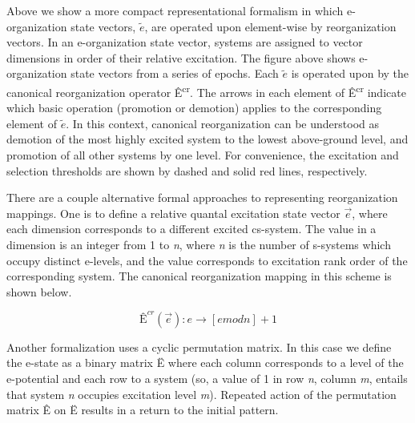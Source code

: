   Above we show a more compact representational formalism in which e-organization state vectors,  $\widetilde{{e}}$, are operated upon element-wise by reorganization vectors. In an e-organization state vector, systems are assigned to vector dimensions in order of their relative excitation. The figure above shows e-organization state vectors from a series of epochs. Each  $\widetilde{{e}}$ is operated upon by the canonical reorganization operator Ê\textsuperscript{cr}. The arrows in each element of Ê\textsuperscript{cr} indicate which basic operation (promotion or demotion) applies to the corresponding element of  $\widetilde{{e}}$. In this context, canonical reorganization can be understood as demotion of the most highly excited system to the lowest above-ground level, and promotion of all other systems by one level. For convenience, the excitation and selection thresholds are shown by dashed and solid red lines, respectively.

  There are a couple alternative formal approaches to representing reorganization mappings. One is to define a relative quantal excitation state vector  $\overrightarrow{{e}}$, where each dimension corresponds to a different excited cs-system. The value in a dimension is an integer from 1 to \textit{n}, where \textit{n} is the number of s-systems which occupy distinct e-levels, and the value corresponds to excitation rank order of the corresponding system. The canonical reorganization mapping in this scheme is shown below.

\begin{equation*}
{\text{Ê}}^{\mathit{cr}}\left(\overrightarrow{{e}}\right):e\rightarrow \left[e\mathit{mod}n\right]+1
\end{equation*}

  Another formalization uses a cyclic permutation matrix. In this case we define the e-state as a binary matrix Ë where each column corresponds to a level of the e-potential and each row to a system (so, a value of 1 in row \textit{n}, column \textit{m}, entails that system \textit{n} occupies excitation level \textit{m}). Repeated action of the permutation matrix Ê on Ë results in a return to the initial pattern. 



